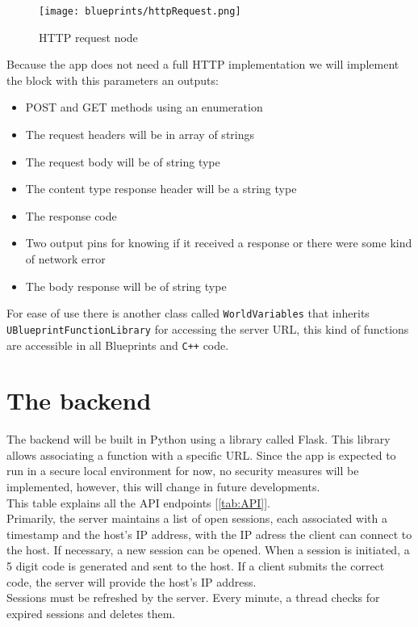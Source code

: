 \begin{figure}[h]
    \centering
    \texttt{[image: blueprints/httpRequest.png]}
    \caption{HTTP request node}
    \label{fig:HTTPrequest}
\end{figure}
\noindent
Because the app does not need a full \ac{HTTP} implementation we will implement the block with this parameters an outputs:
\begin{itemize}
    \item POST and GET methods using an enumeration
    \item The request headers will be in array of strings
    \item The request body will be of string type
    \item The content type response header will be a string type
    \item The response code
    \item Two output pins for knowing if it received a response or there were some kind of network error
    \item The body response will be of string type
\end{itemize}
\noindent
For ease of use there is another class called \texttt{WorldVariables} that inherits \linebreak\texttt{UBlueprintFunctionLibrary} for accessing the server \ac{URL}, this kind of functions are accessible in all Blueprints and \texttt{C++} code.

\section{The backend}
\noindent
The backend will be built in Python using a library called Flask. This library allows associating a function with a specific \ac{URL}.
Since the app is expected to run in a secure local environment for now, no security measures will be implemented, however, this will change in future developments.\\
This table explains all the \ac{API} endpoints [\ref{tab:API}].\\
Primarily, the server maintains a list of open sessions, each associated with a timestamp and the host's \ac{IP} address, with the \ac{IP} adress the client can connect to the host.
If necessary, a new session can be opened. When a session is initiated, a 5 digit code is generated and sent to the host.
If a client submits the correct code, the server will provide the host's IP address.\\
Sessions must be refreshed by the server. Every minute, a thread checks for expired sessions and deletes them.

